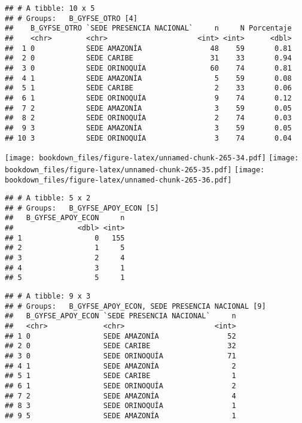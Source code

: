 \documentclass[]{article}
\theoremstyle{definition}
\theoremstyle{definition}
\theoremstyle{definition}
\theoremstyle{remark}
\begin{document}
\begin{verbatim}
## # A tibble: 10 x 5
## # Groups:   B_GYFSE_OTRO [4]
##    B_GYFSE_OTRO `SEDE PRESENCIA NACIONAL`     n     N Porcentaje
##    <chr>        <chr>                     <int> <int>      <dbl>
##  1 0            SEDE AMAZONÍA                48    59       0.81
##  2 0            SEDE CARIBE                  31    33       0.94
##  3 0            SEDE ORINOQUÍA               60    74       0.81
##  4 1            SEDE AMAZONÍA                 5    59       0.08
##  5 1            SEDE CARIBE                   2    33       0.06
##  6 1            SEDE ORINOQUÍA                9    74       0.12
##  7 2            SEDE AMAZONÍA                 3    59       0.05
##  8 2            SEDE ORINOQUÍA                2    74       0.03
##  9 3            SEDE AMAZONÍA                 3    59       0.05
## 10 3            SEDE ORINOQUÍA                3    74       0.04
\end{verbatim}

\texttt{[image: bookdown\_files/figure-latex/unnamed-chunk-265-34.pdf]}
\texttt{[image: bookdown\_files/figure-latex/unnamed-chunk-265-35.pdf]}
\texttt{[image: bookdown\_files/figure-latex/unnamed-chunk-265-36.pdf]}

\begin{verbatim}
## # A tibble: 5 x 2
## # Groups:   B_GYFSE_APOY_ECON [5]
##   B_GYFSE_APOY_ECON     n
##               <dbl> <int>
## 1                 0   155
## 2                 1     5
## 3                 2     4
## 4                 3     1
## 5                 5     1
\end{verbatim}

\begin{verbatim}
## # A tibble: 9 x 3
## # Groups:   B_GYFSE_APOY_ECON, SEDE PRESENCIA NACIONAL [9]
##   B_GYFSE_APOY_ECON `SEDE PRESENCIA NACIONAL`     n
##   <chr>             <chr>                     <int>
## 1 0                 SEDE AMAZONÍA                52
## 2 0                 SEDE CARIBE                  32
## 3 0                 SEDE ORINOQUÍA               71
## 4 1                 SEDE AMAZONÍA                 2
## 5 1                 SEDE CARIBE                   1
## 6 1                 SEDE ORINOQUÍA                2
## 7 2                 SEDE AMAZONÍA                 4
## 8 3                 SEDE ORINOQUÍA                1
## 9 5                 SEDE AMAZONÍA                 1
\end{verbatim}
\end{document}
